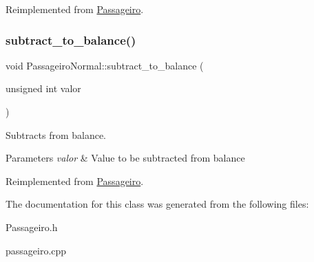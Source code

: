 Reimplemented from \hyperlink{class_passageiro_ad2477f9716b82c3ffbcdfca5bb776679}{Passageiro}.

\mbox{\label{class_passageiro_normal_ae54a661ff7ac80c35175ef925c460766}} 
\subsubsection{\texorpdfstring{subtract\+\_\+to\+\_\+balance()}{subtract\_to\_balance()}}
{\footnotesize\ttfamily void Passageiro\+Normal\+::subtract\+\_\+to\+\_\+balance (\begin{DoxyParamCaption}\item[{unsigned int}]{valor }\end{DoxyParamCaption})\hspace{0.3cm}{\ttfamily [virtual]}}



Subtracts from balance. 


\begin{DoxyParams}{Parameters}
{\em valor} & Value to be subtracted from balance \\
\hline
\end{DoxyParams}


Reimplemented from \hyperlink{class_passageiro_a922b6669669a6e2af2328606013a3a6b}{Passageiro}.



The documentation for this class was generated from the following files\+:\begin{DoxyCompactItemize}
\item 
Passageiro.\+h\item 
passageiro.\+cpp\end{DoxyCompactItemize}
